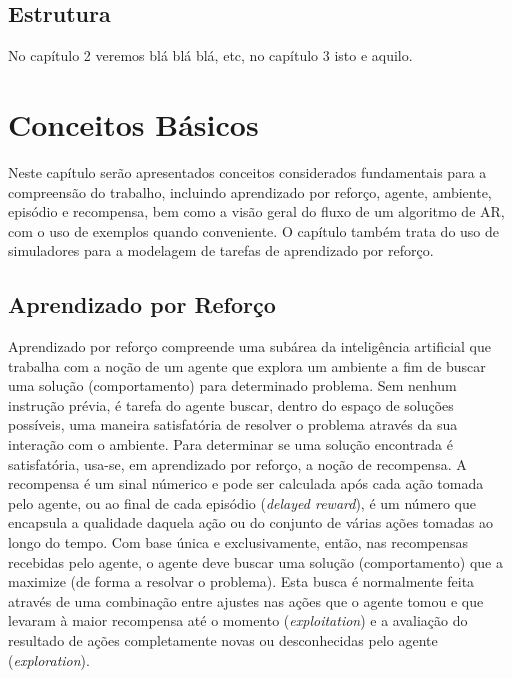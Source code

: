 \documentclass[cic,tc]{iiufrgs}
\begin{document}
    \section{Estrutura}
    No capítulo 2 veremos blá blá blá, etc, no capítulo 3 isto e aquilo.
    
    
    \chapter{Conceitos Básicos}
    Neste capítulo serão apresentados conceitos considerados fundamentais para a compreensão do trabalho, incluindo aprendizado por
    reforço, agente, ambiente, episódio e recompensa, bem como a visão geral do fluxo de um algoritmo de AR, com o uso de exemplos quando conveniente.
    O capítulo também trata do uso de simuladores para a modelagem de tarefas de aprendizado por reforço.
    
    
    \section{Aprendizado por Reforço}
    Aprendizado por reforço compreende uma subárea da inteligência artificial que trabalha com a noção de um agente que explora um ambiente
    a fim de buscar uma solução (comportamento) para determinado problema. Sem nenhum instrução prévia, é tarefa do agente buscar, dentro do espaço
    de soluções possíveis, uma maneira satisfatória de resolver o problema através da sua interação com o ambiente.
    Para determinar se uma solução encontrada é satisfatória, usa-se, em aprendizado por reforço, a noção de recompensa. A recompensa é um sinal númerico e pode ser calculada após cada ação tomada pelo agente, ou ao final de cada episódio (\textit{delayed reward}), é um número que encapsula a
    qualidade daquela ação ou do conjunto de várias ações tomadas ao longo do tempo. Com base única e exclusivamente, então, nas recompensas recebidas pelo agente,
    o agente deve buscar uma solução (comportamento) que a maximize (de forma a resolvar o problema). Esta busca  é normalmente feita através
    de uma combinação entre ajustes nas ações que o agente tomou e que levaram à maior recompensa até o momento (\textit{exploitation}) e a avaliação do resultado de ações completamente
    novas ou desconhecidas pelo agente (\textit{exploration}).
    
\end{document}
